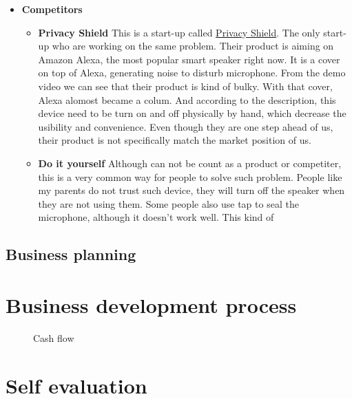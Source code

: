 \documentclass[12pt,twoside]{article}
\begin{document}
\begin{itemize}
\item \textbf{Competitors}\\
\begin{itemize}
    \item \textbf{Privacy Shield} This is a start-up called \href{https://getprivacyshield.co/}{Privacy Shield}. The only start-up who are working on the same problem.
    Their product is aiming on Amazon Alexa, the most popular smart speaker right now. It is a cover on top of Alexa, generating noise to disturb microphone. From the 
    demo video we can see that their product is kind of bulky. With that cover, Alexa alomost became a colum. And according to the description, this device need to be 
    turn on and off physically by hand, which decrease the usibility and convenience. Even though they are one step ahead of us, their product is not specifically match 
    the market position of us.
    \item \textbf{Do it yourself} Although can not be count as a product or competiter, this is a very common way for people to solve such problem. People like my parents
    do not trust such device, they will turn off the speaker when they are not using them. Some people also use tap to seal the microphone, although it doesn't work well.
    This kind of 
\end{itemize}


\end{itemize}
\subsection{Business planning}

\section{Business development process}
\label{sec:Business development process}


\begin{figure}[!h]
    \centering
    \caption{Cash flow}
    \label{fig:Cash flow}
\end{figure}


\section{Self evaluation}



\end{document}
